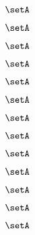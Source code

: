 \begin{forslides}
    \begin{equation}
        \label{eq:slides-processes-145}
        \setA
    \end{equation}

    \begin{equation}
        \label{eq:slides-processes-146}
        \setA
    \end{equation}

    \begin{equation}
        \label{eq:slides-processes-147}
        \setA
    \end{equation}

    \begin{equation}
        \label{eq:slides-processes-148}
        \setA
    \end{equation}

    \begin{equation}
        \label{eq:slides-processes-149}
        \setA
    \end{equation}

    \begin{equation}
        \label{eq:slides-processes-150}
        \setA
    \end{equation}

    \begin{equation}
        \label{eq:slides-processes-151}
        \setA
    \end{equation}

    \begin{equation}
        \label{eq:slides-processes-152}
        \setA
    \end{equation}

    \begin{equation}
        \label{eq:slides-processes-153}
        \setA
    \end{equation}

    \begin{equation}
        \label{eq:slides-processes-154}
        \setA
    \end{equation}

    \begin{equation}
        \label{eq:slides-processes-155}
        \setA
    \end{equation}

    \begin{equation}
        \label{eq:slides-processes-156}
        \setA
    \end{equation}

    \begin{equation}
        \label{eq:slides-processes-157}
        \setA
    \end{equation}


\end{forslides}

